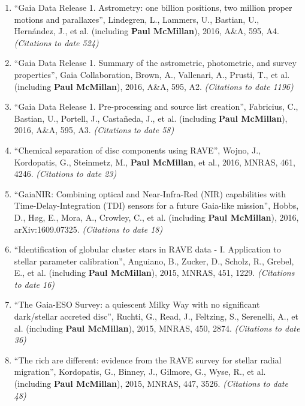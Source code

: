\documentclass{resume}
\begin{document}
\begin{enumerate}
\item ``Gaia Data Release 1. Astrometry: one billion positions, two million proper motions and parallaxes'', Lindegren, L., Lammers, U., Bastian, U., Hern\'andez, J., et al. (including \textbf{Paul McMillan}), 2016, A\&A, 595, A4. \textit{(Citations to date 524)}

\item ``Gaia Data Release 1. Summary of the astrometric, photometric, and survey properties'', Gaia Collaboration, Brown, A., Vallenari, A., Prusti, T., et al. (including \textbf{Paul McMillan}), 2016, A\&A, 595, A2. \textit{(Citations to date 1196)}

\item ``Gaia Data Release 1. Pre-processing and source list creation'', Fabricius, C., Bastian, U., Portell, J., Casta\~neda, J., et al. (including \textbf{Paul McMillan}), 2016, A\&A, 595, A3. \textit{(Citations to date 58)}

\item ``Chemical separation of disc components using RAVE'', Wojno, J., Kordopatis, G., Steinmetz, M., \textbf{Paul McMillan}, et al., 2016, MNRAS, 461, 4246. \textit{(Citations to date 23)}

\item ``GaiaNIR: Combining optical and Near-Infra-Red (NIR) capabilities with Time-Delay-Integration (TDI) sensors for a future Gaia-like mission'', Hobbs, D., H{\o}g, E., Mora, A., Crowley, C., et al. (including \textbf{Paul McMillan}), 2016, arXiv:1609.07325. \textit{(Citations to date 18)}

\item ``Identification of globular cluster stars in RAVE data - I. Application to stellar parameter calibration'', Anguiano, B., Zucker, D., Scholz, R., Grebel, E., et al. (including \textbf{Paul McMillan}), 2015, MNRAS, 451, 1229. \textit{(Citations to date 16)}

\item ``The Gaia-ESO Survey: a quiescent Milky Way with no significant dark/stellar accreted disc'', Ruchti, G., Read, J., Feltzing, S., Serenelli, A., et al. (including \textbf{Paul McMillan}), 2015, MNRAS, 450, 2874. \textit{(Citations to date 36)}

\item ``The rich are different: evidence from the RAVE survey for stellar radial migration'', Kordopatis, G., Binney, J., Gilmore, G., Wyse, R., et al. (including \textbf{Paul McMillan}), 2015, MNRAS, 447, 3526. \textit{(Citations to date 48)}


\end{enumerate}
\end{document}
